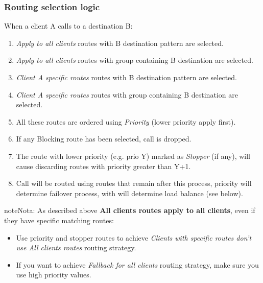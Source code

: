 \documentclass[letterpaper,10pt,spanish]{sphinxmanual}
\begin{document}
\subsubsection{Routing selection logic}
\label{administration_portal/brand/routing/outgoing_routings:routing-selection-logic}
When a client A calls to a destination B:
\begin{enumerate}
\item {} 
\emph{Apply to all clients} routes with B destination pattern are selected.

\item {} 
\emph{Apply to all clients} routes with group containing B destination are selected.

\item {} 
\emph{Client A specific routes} routes with B destination pattern are selected.

\item {} 
\emph{Client A specific routes} routes with group containing B destination are selected.

\item {} 
All these routes are ordered using \emph{Priority} (lower priority apply first).

\item {} 
If any Blocking route has been selected, call is dropped.

\item {} 
The route with lower priority (e.g. prio Y) marked as \emph{Stopper} (if any), will cause discarding routes with priority greater than Y+1.

\item {} 
Call will be routed using routes that remain after this process, priority will determine failover process, with will determine load balance (see below).

\end{enumerate}

\begin{notice}{note}{Nota:}
As described above \textbf{All clients routes apply to all clients}, even if they have specific matching routes:
\begin{itemize}
\item {} 
Use priority and stopper routes to achieve \emph{Clients with specific routes don't use All clients routes} routing strategy.

\item {} 
If you want to achieve \emph{Fallback for all clients} routing strategy, make sure you use high priority values.

\end{itemize}
\end{notice}
\end{document}
